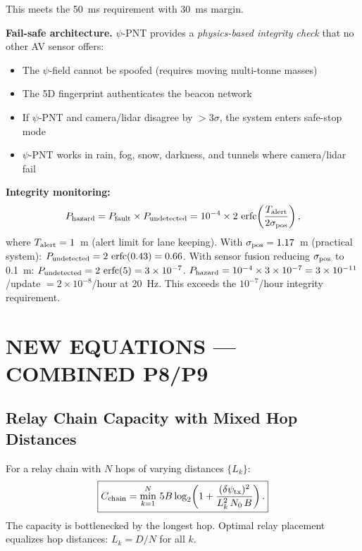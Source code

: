 \documentclass[aps,prd,twocolumn,superscriptaddress,nofootinbib]{revtex4-2}
\DeclareMathOperator{\erfc}{erfc}
\begin{document}
This meets the 50~ms requirement with 30~ms margin.

\textbf{Fail-safe architecture.}
$\psi$-PNT provides a \emph{physics-based integrity check} that no
other AV sensor offers:
\begin{itemize}
\item The $\psi$-field cannot be spoofed (requires moving multi-tonne
masses)
\item The 5D fingerprint authenticates the beacon network
\item If $\psi$-PNT and camera/lidar disagree by $> 3\sigma$, the
system enters safe-stop mode
\item $\psi$-PNT works in rain, fog, snow, darkness, and tunnels
where camera/lidar fail
\end{itemize}

\textbf{Integrity monitoring:}
\begin{equation}
P_{\rm hazard} = P_{\rm fault}\times P_{\rm undetected}
= 10^{-4}\times 2\,\erfc\!\left(\frac{T_{\rm alert}}{2\sigma_{\rm pos}}\right),
\end{equation}
where $T_{\rm alert} = 1$~m (alert limit for lane keeping).
With $\sigma_{\rm pos} = 1.17$~m (practical system):
$P_{\rm undetected} = 2\,\erfc(0.43) = 0.66$.  With sensor fusion
reducing $\sigma_{\rm pos}$ to 0.1~m:
$P_{\rm undetected} = 2\,\erfc(5) = 3\times10^{-7}$.
$P_{\rm hazard} = 10^{-4}\times 3\times10^{-7} = 3\times10^{-11}$/update
$= 2\times10^{-8}$/hour at 20~Hz.
This exceeds the $10^{-7}$/hour integrity requirement.

\section{NEW EQUATIONS --- COMBINED P8/P9}
\label{sec:equations}

\subsection{Relay Chain Capacity with Mixed Hop Distances}

For a relay chain with $N$ hops of varying distances $\{L_k\}$:
\begin{equation}
\boxed{
C_{\rm chain} = \min_{k=1}^{N}\,5B\log_2\!\left(1 +
\frac{(\delta\psi_{\rm tx})^2}{L_k^2\,N_0\,B}\right).
}
\label{eq:mixed-chain}
\end{equation}
The capacity is bottlenecked by the longest hop.  Optimal relay
placement equalizes hop distances: $L_k = D/N$ for all $k$.
\end{document}
